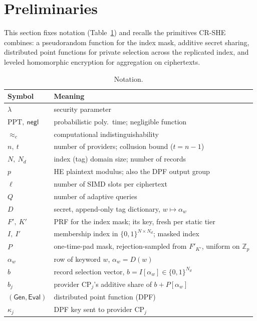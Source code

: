 \documentclass[a4paper,fleqn]{cas-dc}
\newcommand{\negl}{\mathsf{negl}}
\newcommand{\PPT}{\mathrm{PPT}}
\newcommand{\cind}{\approx_c}
\newcommand{\Gen}{\mathsf{Gen}}
\newcommand{\Eval}{\mathsf{Eval}}
\begin{document}
\section{Preliminaries}
\label{sec:prelim}

This section fixes notation (Table~\ref{tab:notation}) and recalls the
primitives CR-SHE combines: a pseudorandom function for the index mask,
additive secret sharing, distributed point functions for private selection
across the replicated index, and leveled homomorphic encryption for
aggregation on ciphertexts.

\begin{table}[pos=t]
\caption{Notation.}
\label{tab:notation}
\centering
\footnotesize
\setlength{\tabcolsep}{4pt}
\begin{tabular}{@{}l>{\raggedright\arraybackslash}p{5.5cm}@{}}
\toprule
Symbol & Meaning \\
\midrule
$\lambda$ & security parameter \\
$\PPT,\ \negl$ & probabilistic poly.\ time; negligible function \\
$\cind$ & computational indistinguishability \\
$n,\ t$ & number of providers; collusion bound ($t=n-1$) \\
$N,\ N_d$ & index (tag) domain size; number of records \\
$p$ & HE plaintext modulus; also the DPF output group \\
$\ell$ & number of SIMD slots per ciphertext \\
$Q$ & number of adaptive queries \\
$D$ & secret, append-only tag dictionary, $w\mapsto\alpha_w$ \\
$F',\ K'$ & PRF for the index mask; its key, fresh per static tier \\
$I,\ I'$ & membership index in $\{0,1\}^{N\times N_d}$; masked index \\
$P$ & one-time-pad mask, rejection-sampled from $F'_{K'}$, uniform on
$\mathbb{Z}_p$ \\
$\alpha_w$ & row of keyword $w$, $\alpha_w=D(w)$ \\
$b$ & record selection vector, $b=I[\alpha_w]\in\{0,1\}^{N_d}$ \\
$b_j$ & provider $\text{CP}_j$'s additive share of $b+P[\alpha_w]$ \\
$(\Gen,\Eval)$ & distributed point function (DPF) \\
$\kappa_j$ & DPF key sent to provider $\text{CP}_j$ \\

\end{tabular}
\end{table}
\end{document}
